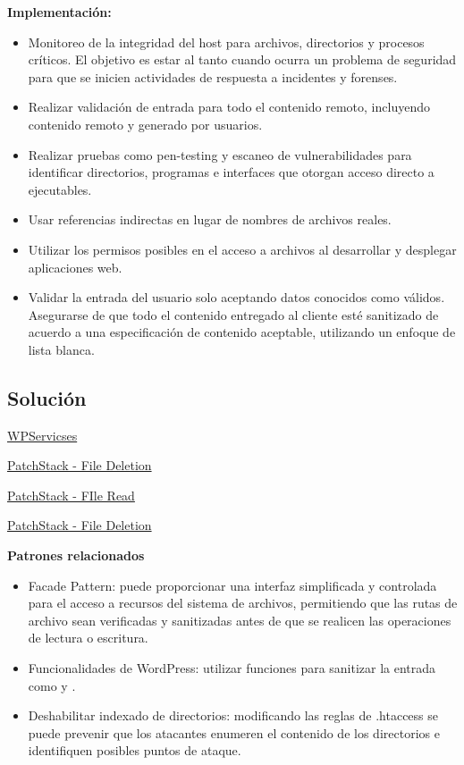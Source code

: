 \textbf{Implementación:}

\begin{itemize}
    \item Monitoreo de la integridad del host para archivos, directorios y procesos críticos. El objetivo es estar al tanto cuando ocurra un problema de seguridad para que se inicien actividades de respuesta a incidentes y forenses.
    \item Realizar validación de entrada para todo el contenido remoto, incluyendo contenido remoto y generado por usuarios.
    \item Realizar pruebas como pen-testing y escaneo de vulnerabilidades para identificar directorios, programas e interfaces que otorgan acceso directo a ejecutables.
    \item Usar referencias indirectas en lugar de nombres de archivos reales.
    \item Utilizar los permisos posibles en el acceso a archivos al desarrollar y desplegar aplicaciones web.
    \item Validar la entrada del usuario solo aceptando datos conocidos como válidos. Asegurarse de que todo el contenido entregado al cliente esté sanitizado de acuerdo a una especificación de contenido aceptable, utilizando un enfoque de lista blanca.
\end{itemize}

\subsection*{\textbf{Solución}}

\href{https://www.wpservices.com/stay-secure-protecting-your-wordpress-site-from-directory-traversal-vulnerabilities/}{WPServicses}

\href{https://patchstack.com/academy/wordpress/securing-code/arbitrary-file-deletion/#how-to-secure}{PatchStack - File Deletion}

\href{https://patchstack.com/academy/wordpress/securing-code/arbitrary-file-read/#how-to-secure}{PatchStack - FIle Read}

\href{https://patchstack.com/academy/wordpress/securing-code/arbitrary-file-deletion/}{PatchStack - File Deletion}

\textbf{Patrones relacionados}

\begin{itemize}
    \item Facade Pattern: puede proporcionar una interfaz simplificada y controlada para el acceso a recursos del sistema de archivos, permitiendo que las rutas de archivo sean verificadas y sanitizadas antes de que se realicen las operaciones de lectura o escritura. 
    \item Funcionalidades de WordPress: utilizar funciones para sanitizar la entrada como  y .
    \item Deshabilitar indexado de directorios: modificando las reglas de .htaccess se puede prevenir que los atacantes enumeren el contenido de los directorios  e identifiquen posibles puntos de ataque.
\end{itemize}
